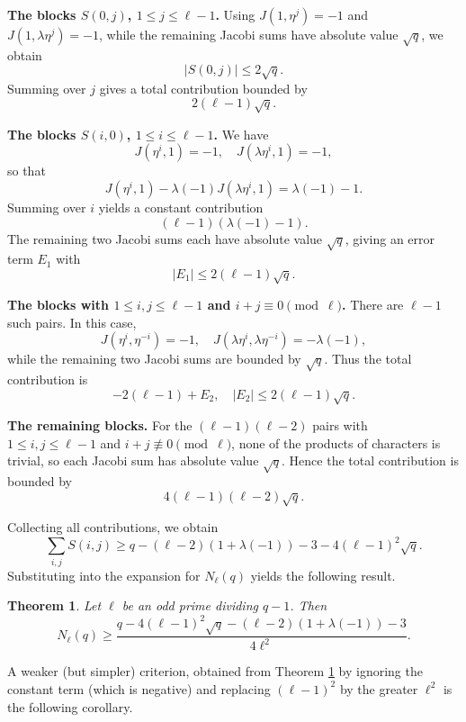 \documentclass[12pt]{amsart}
\newtheorem{thm}{Theorem}[section]
\numberwithin{equation}{section}
\begin{document}
\medskip

\noindent
\textbf{The blocks $S(0,j)$, $1 \le j \le \ell-1$.}
Using $J(1,\eta^j)=-1$ and $J(1,\lambda\eta^j)=-1$, while the remaining Jacobi sums have absolute value $\sqrt{q}$, we obtain
\[
|S(0,j)| \le 2\sqrt{q}.
\]
Summing over $j$ gives a total contribution bounded by
\[
2(\ell-1)\sqrt{q}.
\]

\medskip

\noindent
\textbf{The blocks $S(i,0)$, $1 \le i \le \ell-1$.}
We have
\[
J(\eta^i,1) = -1, \quad J(\lambda\eta^i,1) = -1,
\]
so that
\[
J(\eta^i,1) - \lambda(-1)J(\lambda\eta^i,1)
= \lambda(-1) - 1.
\]
Summing over $i$ yields a constant contribution
\[
(\ell-1)(\lambda(-1)-1).
\]
The remaining two Jacobi sums each have absolute value $\sqrt{q}$, giving an error term $E_1$ with
\[
|E_1| \le 2(\ell-1)\sqrt{q}.
\]

\medskip

\noindent
\textbf{The blocks with $1 \le i,j \le \ell-1$ and $i+j \equiv 0 \pmod{\ell}$.}
There are $\ell-1$ such pairs. In this case,
\[
J(\eta^i,\eta^{-i}) = -1, \quad
J(\lambda\eta^i,\lambda\eta^{-i}) = -\lambda(-1),
\]
while the remaining two Jacobi sums are bounded by $\sqrt{q}$. Thus the total contribution is
\[
-2(\ell-1) + E_2,
\quad
|E_2| \le 2(\ell-1)\sqrt{q}.
\]

\medskip

\noindent
\textbf{The remaining blocks.}
For the $(\ell-1)(\ell-2)$ pairs with $1 \le i,j \le \ell-1$ and $i+j \not\equiv 0 \pmod{\ell}$, none of the products of characters is trivial, so each Jacobi sum has absolute value $\sqrt{q}$. Hence the total contribution is bounded by
\[
4(\ell-1)(\ell-2)\sqrt{q}.
\]

\medskip

Collecting all contributions, we obtain
\[
\sum_{i,j} S(i,j)
\ge q - (\ell-2)(1+\lambda(-1)) - 3 - 4(\ell-1)^2\sqrt{q}.
\]
Substituting into  the expansion for $N_\ell(q)$ yields the following result.

\begin{thm}\label{thm:main}
Let $\ell$ be an odd prime dividing $q-1$. Then
\begin{equation}\label{mainbound}
N_\ell(q) \ge \frac{q - 4(\ell-1)^2 \sqrt{q} - (\ell-2)(1+\lambda(-1)) - 3}{4\ell^2}.
\end{equation}
\end{thm}

A weaker  (but simpler) criterion, obtained from Theorem \ref{thm:main} by ignoring  the constant term (which is negative) and replacing $(\ell-1)^2$ by the greater  $\ell^2$ is the following corollary.
\end{document}
